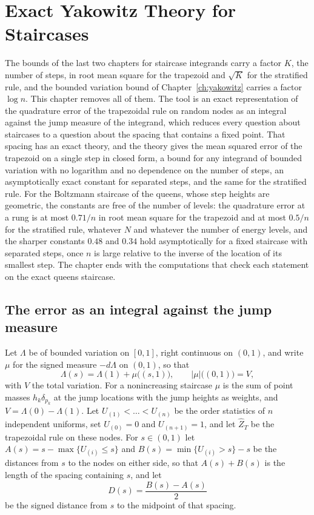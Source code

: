 \chapter{Exact Yakowitz Theory for Staircases}
\label{ch:staircase}

The bounds of the last two chapters for staircase integrands carry a factor $K$, the number of steps, in root mean square for the trapezoid and $\sqrt K$ for the stratified rule, and the bounded variation bound of Chapter~\ref{ch:yakowitz} carries a factor $\log n$. This chapter removes all of them. The tool is an exact representation of the quadrature error of the trapezoidal rule on random nodes as an integral against the jump measure of the integrand, which reduces every question about staircases to a question about the spacing that contains a fixed point. That spacing has an exact theory, and the theory gives the mean squared error of the trapezoid on a single step in closed form, a bound for any integrand of bounded variation with no logarithm and no dependence on the number of steps, an asymptotically exact constant for separated steps, and the same for the stratified rule. For the Boltzmann staircase of the queens, whose step heights are geometric, the constants are free of the number of levels: the quadrature error at a rung is at most $0.71 / n$ in root mean square for the trapezoid and at most $0.5 / n$ for the stratified rule, whatever $N$ and whatever the number of energy levels, and the sharper constants $0.48$ and $0.34$ hold asymptotically for a fixed staircase with separated steps, once $n$ is large relative to the inverse of the location of its smallest step. The chapter ends with the computations that check each statement on the exact queens staircase.

\section{The error as an integral against the jump measure}

Let $\Lambda$ be of bounded variation on $[0, 1]$, right continuous on $(0, 1)$, and write $\mu$ for the signed measure $-d\Lambda$ on $(0, 1)$, so that
\[
\Lambda(s) = \Lambda(1) + \mu\big( (s, 1) \big) , \qquad |\mu|\big( (0,1) \big) = V ,
\]
with $V$ the total variation. For a nonincreasing staircase $\mu$ is the sum of point masses $h_k \delta_{p_k}$ at the jump locations with the jump heights as weights, and $V = \Lambda(0) - \Lambda(1)$. Let $U_{(1)} < \dots < U_{(n)}$ be the order statistics of $n$ independent uniforms, set $U_{(0)} = 0$ and $U_{(n+1)} = 1$, and let $\hat Z_T$ be the trapezoidal rule on these nodes. For $s \in (0, 1)$ let $A(s) = s - \max\{ U_{(i)} \le s \}$ and $B(s) = \min\{ U_{(i)} > s \} - s$ be the distances from $s$ to the nodes on either side, so that $A(s) + B(s)$ is the length of the spacing containing $s$, and let
\[
D(s) = \frac{ B(s) - A(s) }{2}
\]
be the signed distance from $s$ to the midpoint of that spacing.

